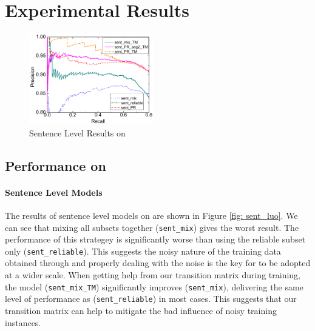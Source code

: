 \section{Experimental Results \label{sec:evaluation}}

\begin{figure}[t!]
\begin{center}
\includegraphics[width=0.48\textwidth]{figures/sent_time_exp_overall.pdf}
\caption{Sentence Level Results on \TimeRE}
\label{fig: sent_luo}
\end{center}
\end{figure}



\subsection{Performance on \TimeRE} \label{sec:results_in_TimeRE}

\paragraph{Sentence Level Models}
The results of sentence level models on \TimeRE are shown in Figure \ref{fig:
sent_luo}. We can see that mixing all subsets together (\texttt{sent\_mix})
gives the worst result. The performance of this strategey is significantly
worse than using the reliable subset only (\texttt{sent\_reliable}). This
suggests the noisy nature of the training data obtained through \DS and
properly dealing with the noise is the key for \DS to be adopted at a wider
scale. When getting help from our transition matrix during training, the
model (\texttt{sent\_mix\_TM}) significantly improves (\texttt{sent\_mix}),
delivering the same level of performance as (\texttt{sent\_reliable}) in most
cases. This suggests that our transition matrix can help to mitigate the bad influence of noisy training instances.


